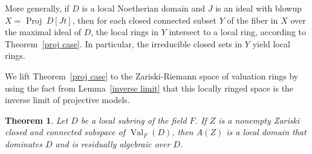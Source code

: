 \documentclass[preprint, 11pt,nonatbib]{elsarticle}
\DeclareMathOperator{\Dom}{Val}
\newtheorem{theorem}{Theorem}
\theoremstyle{definition}
\numberwithin{theorem}{section}
\begin{document}
More generally, if $D$ is a local Noetherian domain and $J$ is an ideal with blowup  $X = $ {Proj~$D[Jt]$}, then for each closed connected subset $Y$ of the fiber in $X$ over the maximal ideal of $D$, the local rings in $Y$ 
 intersect to a local ring, according to Theorem~\ref{proj case}. In particular, the irreducible closed sets in $Y$ yield local rings. 


We   lift  Theorem~\ref{proj case} to the Zariski-Riemann space of valuation rings by using the fact from Lemma~\ref{inverse limit} that this locally ringed space is the inverse limit   of projective models. 




\begin{theorem} \label{is local}
Let $D$ be a local subring of the field $F$.
If ${Z}$ is a nonempty Zariski closed and connected subspace of  $\Dom_F(D)$, then $A({Z})$ is a local domain that dominates $D$ and is residually algebraic over $D$. 
\end{theorem}
\end{document}
